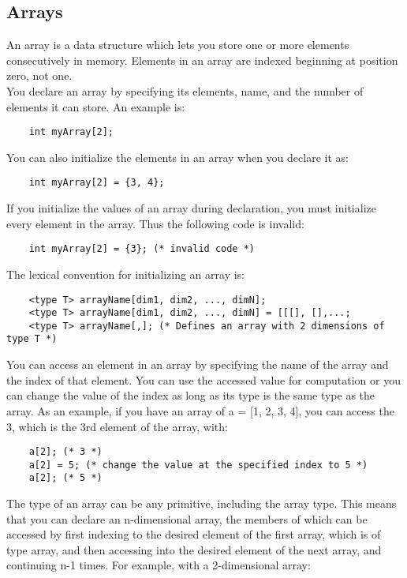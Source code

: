 \begin{homeworkProblem}
	\subsection{Arrays}
	An array is a data structure which lets you store one or more elements consecutively in memory. Elements in an array are indexed beginning at position zero, not one.\\

	You declare an array by specifying its elements, name, and the number of elements it can store. An example is:\\


	\begin{verbatim}
	int myArray[2];
	\end{verbatim}

	You can also initialize the elements in an array when you declare it as:


	\begin{verbatim}
	int myArray[2] = {3, 4};
	\end{verbatim}

	If you initialize the values of an array during declaration, you must initialize every element in the array. Thus the following code is invalid: 

	\begin{verbatim}
	int myArray[2] = {3}; (* invalid code *)
	\end{verbatim}

	The lexical convention for initializing an array is:


	\begin{verbatim}
	<type T> arrayName[dim1, dim2, ..., dimN];
	<type T> arrayName[dim1, dim2, ..., dimN] = [[[], [],...;
	<type T> arrayName[,]; (* Defines an array with 2 dimensions of type T *)
	\end{verbatim}

	You can access an element in an array by specifying the name of the array and the index of that element. You can use the accessed value for computation or you can change the value of the index as long as its type is the same type as the array. As an example, if you have an array of a = [1, 2, 3, 4], you can access the 3, which is the 3rd element of the array, with:


	\begin{verbatim}
	a[2]; (* 3 *)
	a[2] = 5; (* change the value at the specified index to 5 *)
	a[2]; (* 5 *)
	\end{verbatim}

	The type of an array can be any primitive, including the array type. This means that you can declare an n-dimensional array, the members of which can be accessed by first indexing to the desired element of the first array, which is of type array, and then accessing into the desired element of the next array, and continuing n-1 times. For example, with a 2-dimensional array:



\end{homeworkProblem}
